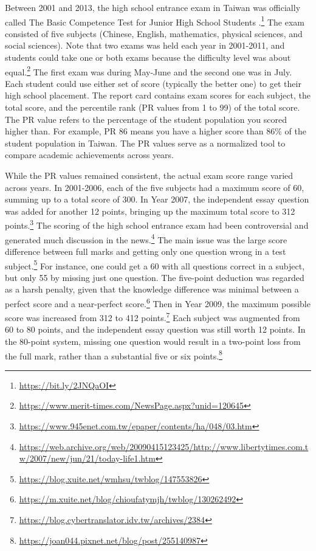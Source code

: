 \documentclass[
]{article}
\begin{document}
Between 2001 and 2013, the high school entrance exam in Taiwan was
officially called The Basic Competence Test for Junior High School
Students \citep{chou2007schooling}.\footnote{\url{https://bit.ly/2JNQaOI}}
The exam consisted of five subjects (Chinese, English, mathematics,
physical sciences, and social sciences). Note that two exams was held
each year in 2001-2011, and students could take one or both exams
because the difficulty level was about equal.\footnote{\url{https://www.merit-times.com/NewsPage.aspx?unid=120645}}
The first exam was during May-June and the second one was in July. Each
student could use either set of score (typically the better one) to get
their high school placement. The report card contains exam scores for
each subject, the total score, and the percentile rank (PR values from 1
to 99) of the total score. The PR value refers to the percentage of the
student population you scored higher than. For example, PR 86 means you
have a higher score than 86\% of the student population in Taiwan. The
PR values serve as a normalized tool to compare academic achievements
across years.

While the PR values remained consistent, the actual exam score range
varied across years. In 2001-2006, each of the five subjects had a
maximum score of 60, summing up to a total score of 300. In Year 2007,
the independent essay question was added for another 12 points, bringing
up the maximum total score to 312 points.\footnote{\url{https://www.945enet.com.tw/epaper/contents/ha/048/03.htm}}
The scoring of the high school entrance exam had been controversial and
generated much discussion in the news.\footnote{\url{https://web.archive.org/web/20090415123425/http://www.libertytimes.com.tw/2007/new/jun/21/today-life1.htm}}
The main issue was the large score difference between full marks and
getting only one question wrong in a test subject.\footnote{\url{https://blog.xuite.net/wmhsu/twblog/147553826}}
For instance, one could get a 60 with all questions correct in a
subject, but only 55 by missing just one question. The five-point
deduction was regarded as a harsh penalty, given that the knowledge
difference was minimal between a perfect score and a near-perfect
score.\footnote{\url{https://m.xuite.net/blog/chioufatymjh/twblog/130262492}}
Then in Year 2009, the maximum possible score was increased from 312 to
412 points.\footnote{\url{https://blog.cybertranslator.idv.tw/archives/2384}}
Each subject was augmented from 60 to 80 points, and the independent
essay question was still worth 12 points. In the 80-point system,
missing one question would result in a two-point loss from the full
mark, rather than a substantial five or six points.\footnote{\url{https://joan044.pixnet.net/blog/post/255140987}}
\end{document}
